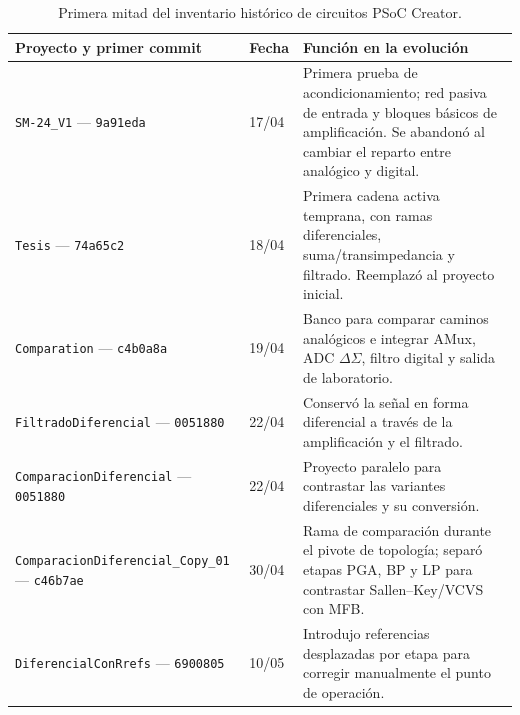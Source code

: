 \begin{table}[ht]
\centering
\scriptsize
\caption{Primera mitad del inventario hist\'orico de circuitos PSoC Creator.}
\label{tab:git-circuitos-a}
\begin{tabularx}{\textwidth}{@{}>{\raggedright\arraybackslash}p{} p{} Y@{}}
\toprule
\textbf{Proyecto y primer commit} & \textbf{Fecha} & \textbf{Funci\'on en la evoluci\'on} \\
\midrule
\texttt{SM-24\_V1} --- \texttt{9a91eda} & 17/04 & Primera prueba de acondicionamiento; red pasiva de entrada y bloques b\'asicos de amplificaci\'on. Se abandon\'o al cambiar el reparto entre anal\'ogico y digital. \\
\texttt{Tesis} --- \texttt{74a65c2} & 18/04 & Primera cadena activa temprana, con ramas diferenciales, suma/transimpedancia y filtrado. Reemplaz\'o al proyecto inicial. \\
\texttt{Comparation} --- \texttt{c4b0a8a} & 19/04 & Banco para comparar caminos anal\'ogicos e integrar AMux, ADC $\Delta\Sigma$, filtro digital y salida de laboratorio. \\
\texttt{FiltradoDiferencial} --- \texttt{0051880} & 22/04 & Conserv\'o la se\~nal en forma diferencial a trav\'es de la amplificaci\'on y el filtrado. \\
\texttt{ComparacionDiferencial} --- \texttt{0051880} & 22/04 & Proyecto paralelo para contrastar las variantes diferenciales y su conversi\'on. \\
\texttt{ComparacionDiferencial\_Copy\_01} --- \texttt{c46b7ae} & 30/04 & Rama de comparaci\'on durante el pivote de topolog\'ia; separ\'o etapas PGA, BP y LP para contrastar Sallen--Key/VCVS con MFB. \\
\texttt{DiferencialConRrefs} --- \texttt{6900805} & 10/05 & Introdujo referencias desplazadas por etapa para corregir manualmente el punto de operaci\'on. \\
\bottomrule
\end{tabularx}
\end{table}

